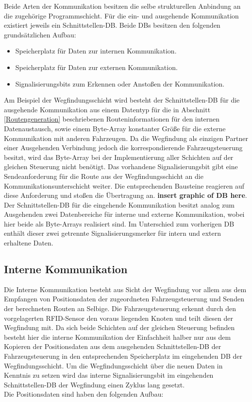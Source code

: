 		Beide Arten der Kommunikation besitzen die selbe strukturellen Anbindung an die zugehörige Programmschicht. Für die ein- und ausgehende Kommunikation existiert jeweils ein Schnittstellen-\ac{DB}. Beide \ac{DB}s besitzen den folgenden grundsätzlichen Aufbau:
		
		\begin{itemize}
			\item Speicherplatz für Daten zur internen Kommunikation.
			\item Speicherplatz für Daten zur externen Kommunikation.
			\item Signalisierungsbits zum Erkennen oder Anstoßen der Kommunikation.
		\end{itemize}
		
		Am Beispiel der Wegfindungsschicht wird besteht der Schnittstellen-\ac{DB} für die ausgehende Kommunikation aus einem Datentyp für die in Abschnitt \ref{Routengeneration} beschriebenen Routeninformationen für den internen Datenaustausch, sowie einem Byte-Array konstanter Größe für die externe Kommunikation mit anderen Fahrzeugen. Da die Wegfindung  als einzigen Partner einer Ausgehenden Verbindung jedoch die korrespondierende Fahrzeugsteuerung  besitzt, wird das Byte-Array bei der Implementierung aller Schichten auf der gleichen Steuerung nicht benötigt. Das vorhandene Signalisierungsbit gibt eine Sendeanforderung für die Route aus der Wegfindungsschicht an die Kommunikationsunterschicht weiter.  Die entsprechenden Bausteine reagieren auf diese Anforderung und stoßen die Übertragung an. \textbf{insert graphic of DB here}.
		\\
		Der Schnittstellen-DB für die eingehende Kommunikation besitzt analog zum Ausgehenden zwei Datenbereiche für interne und externe Kommunikation, wobei hier beide als Byte-Arrays realisiert sind. Im Unterschied zum vorherigen \ac{DB} enthält dieser zwei getrennte Signalisierungsmerker für intern und extern erhaltene Daten.
		
	\subsection{Interne Kommunikation}
		\label{Interne Kommunikation}
		Die Interne Kommunikation besteht aus Sicht der Wegfindung vor allem aus dem Empfangen von Positionsdaten der zugeordneten Fahrzeugsteuerung und Senden der berechneten Routen an Selbige. Die Fahrzeugsteuerung erkennt durch den vorgelagerten RFID-Sensor den voraus liegenden Knoten und teilt diesen der Wegfindung mit. Da sich beide Schichten auf der gleichen Steuerung befinden besteht hier die interne Kommunikation der Einfachheit halber nur aus dem Kopieren der Positionsdaten aus dem ausgehenden Schnittstellen-\ac{DB} der Fahrzeugsteuerung in den entsprechenden Speicherplatz im eingehenden \ac{DB} der Wegfindungsschicht. Um die Wegfindungsschicht über die neuen Daten in Kenntnis zu setzen wird das  interne Signalisierungsbit im eingehenden Schnittstellen-\ac{DB} der Wegfindung einen Zyklus lang gesetzt.
		\\
		Die Positionsdaten sind haben den folgenden Aufbau:
		
